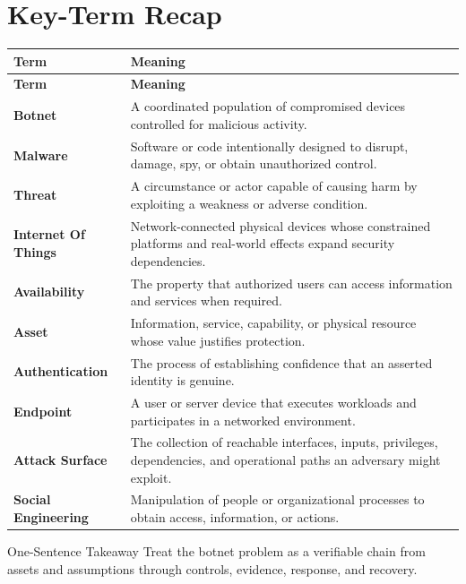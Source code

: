 \documentclass[11pt,letterpaper]{article}
\begin{document}
\section*{Key-Term Recap}
\begin{longtable}{>{\raggedright\arraybackslash}p{}>{\raggedright\arraybackslash}p{}}
\toprule\rowcolor{Navy}\color{white}\textbf{Term} & \color{white}\textbf{Meaning}\\\midrule
\endfirsthead
\toprule\rowcolor{Navy}\color{white}\textbf{Term} & \color{white}\textbf{Meaning}\\\midrule
\endhead
\textbf{Botnet} & A coordinated population of compromised devices controlled for malicious activity. \\\midrule
\textbf{Malware} & Software or code intentionally designed to disrupt, damage, spy, or obtain unauthorized control. \\\midrule
\textbf{Threat} & A circumstance or actor capable of causing harm by exploiting a weakness or adverse condition. \\\midrule
\textbf{Internet Of Things} & Network-connected physical devices whose constrained platforms and real-world effects expand security dependencies. \\\midrule
\textbf{Availability} & The property that authorized users can access information and services when required. \\\midrule
\textbf{Asset} & Information, service, capability, or physical resource whose value justifies protection. \\\midrule
\textbf{Authentication} & The process of establishing confidence that an asserted identity is genuine. \\\midrule
\textbf{Endpoint} & A user or server device that executes workloads and participates in a networked environment. \\\midrule
\textbf{Attack Surface} & The collection of reachable interfaces, inputs, privileges, dependencies, and operational paths an adversary might exploit. \\\midrule
\textbf{Social Engineering} & Manipulation of people or organizational processes to obtain access, information, or actions. \\\midrule
\bottomrule
\end{longtable}
\begin{CornellExamBox}{One-Sentence Takeaway}
Treat the botnet problem as a verifiable chain from assets and assumptions through controls, evidence, response, and recovery.
\end{CornellExamBox}
\end{document}
